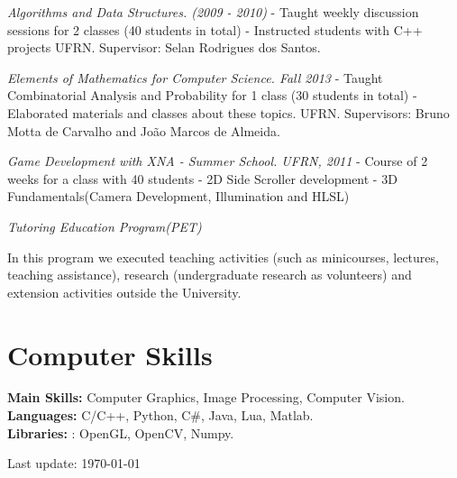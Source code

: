 \documentclass[letterpaper]{article}
\def\footerlink{}
\renewenvironment{itemize}{
  \begin{list}{}{
      \setlength{\leftmargin}{1.5em}
    }
  }{
  \end{list}
}
\begin{document}
\begin{itemize}

  \item \textit{Algorithms and Data Structures. (2009 - 2010)}
  - Taught weekly discussion sessions for 2 classes (40 students in total)
  - Instructed students with C++ projects
  UFRN. Supervisor: Selan Rodrigues dos Santos.
  
  \item \textit{Elements of Mathematics for Computer Science. Fall 2013}
  - Taught Combinatorial Analysis and Probability for 1 class (30 students in total)
  - Elaborated materials and classes about these topics.
  UFRN. Supervisors: Bruno Motta de Carvalho and Jo\~ao Marcos de Almeida. 
  
  \item \textit{Game Development with XNA - Summer School. UFRN, 2011}
  - Course of 2 weeks for a class with 40 students
  - 2D Side Scroller development
  - 3D Fundamentals(Camera Development, Illumination and HLSL)
  
  \item \textit{Tutoring Education Program(PET)}
  
  In this program we executed teaching activities (such as minicourses, lectures, teaching assistance), research (undergraduate research as volunteers) and extension activities outside the University.
 
\end{itemize}

\section*{Computer Skills}

 \textbf{Main Skills:} Computer Graphics, Image Processing, Computer Vision.\\
 \textbf{Languages:} C/C++, Python, C\#, Java, Lua, Matlab.\\
 \textbf{Libraries:} : OpenGL, OpenCV, Numpy.\\


\bigskip
\begin{center}
  \begin{footnotesize}
    Last update: \today \\
    \href{\footerlink}{\texttt{\footerlink}}
  \end{footnotesize}
\end{center}
\end{document}
